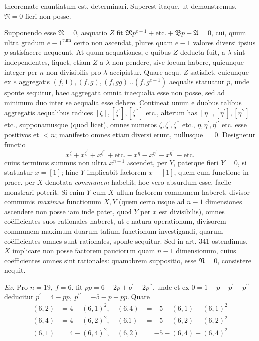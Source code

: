 theoremate enuntiatum est, determinari. Superest itaque, ut demonstremus, \(\mathfrak N=0\) fieri non posse.

Supponendo esse \(\mathfrak N=0\), aequatio \(Z\) fit \(\mathfrak Mp^{e-1}+\text{etc.}+\mathfrak Bp+\mathfrak A=0\), cui, quum ultra gradum \(e-1^{\mathrm{tum}}\) certo non ascendat, plures quam \(e-1\) valores diversi ipsius \(p\) satisfacere nequeunt. At quum aequationes, e quibus \(Z\) deducta fuit, a \(\lambda\) sint independentes, liquet, etiam \(Z\) a \(\lambda\) non pendere, sive locum habere, quicunque integer per \(n\) non divisibilis pro \(\lambda\) accipiatur. Quare aequ. \(Z\) satisfiet, cuicunque ex \(e\) aggregatis \((f,\allowbreak 1),\allowbreak (f,\allowbreak g),\allowbreak (f,\allowbreak gg)\ldots(f,\allowbreak g^{e-1})\) aequalis statuatur \(p\), unde sponte sequitur, haec aggregata omnia inaequalia esse non posse, sed ad minimum duo inter se aequalia esse debere. Contineat unum e duobus talibus aggregatis aequalibus radices \([\zeta],\allowbreak [\zeta^{\prime}],\allowbreak [\zeta^{\prime\prime}]\) etc., alterum has \([\eta],\allowbreak [\eta^{\prime}],\allowbreak [\eta^{\prime\prime}]\) etc., supponamusque (quod licet), omnes numeros \(\zeta,\allowbreak \zeta^{\prime},\allowbreak \zeta^{\prime\prime}\) etc., \(\eta,\allowbreak \eta^{\prime},\allowbreak \eta^{\prime\prime}\) etc. esse positivos et \(<n\); manifesto omnes etiam diversi erunt, nullusque \(=0\). Designetur functio \[x^\zeta+x^{\zeta^{\prime}}+x^{\zeta^{\prime\prime}}+\text{etc.}-x^\eta-x^{\eta^{\prime}}-x^{\eta^{\prime\prime}}-\text{etc.}\] cuius terminus summus non ultra \(x^{n-1}\) ascendet, per \(Y\), patetque fieri \(Y=0\), si statuatur \(x=[1]\); hinc \(Y\) implicabit factorem \(x-[1]\), quem cum functione in praec. per \(X\) denotata \textit{communem} habebit; hoc vero absurdum esse, facile monstrari poterit. Si enim \(Y\) cum \(X\) ullum factorem communem haberet, divisor communis \textit{maximus} functionum \(X,\allowbreak Y\) (quem certo usque ad \(n-1\) dimensiones ascendere non posse iam inde patet, quod \(Y\) per \(x\) est divisibilis), omnes coëfficientes suos rationales haberet, ut e natura operationum, divisorem communem maximum duarum talium functionum investigandi, quarum coëfficientes omnes sunt rationales, sponte sequitur. Sed in art. 341 ostendimus, \(X\) implicare non posse factorem pauciorum quam \(n-1\) dimensionum, cuius coëfficientes omnes sint rationales: quamobrem suppositio, esse \(\mathfrak N=0\), consistere nequit.

\textit{Ex.} Pro \(n=19,\allowbreak \ f=6\). fit \(pp=6+2p+p^{\prime}+2p^{\prime\prime}\), unde et ex \(0=1+p+p^{\prime}+p^{\prime\prime}\) deducitur \(p^{\prime}=4-pp,\allowbreak \ p^{\prime\prime}=-5-p+pp\). Quare \[\begin{aligned}(6,2)&=4-(6,1)^2,\ &(6,4)&=-5-(6,1)+(6,1)^2\\(6,\allowbreak 4)&=4-(6,\allowbreak 2)^2,\allowbreak \ &(6.1)&=-5-(6,\allowbreak 2)+(6,\allowbreak 2)^2\\(6,\allowbreak 1)&=4-(6,\allowbreak 4)^2,\allowbreak \ &(6,\allowbreak 2)&=-5-(6,\allowbreak 4)+(6,\allowbreak 4)^2\end{aligned}\]

